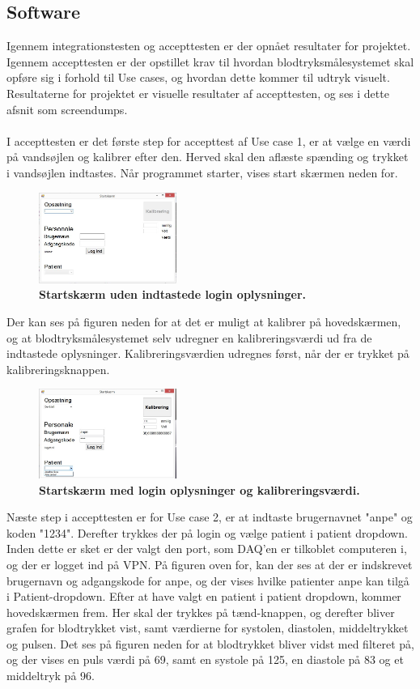 \subsection{Software}
Igennem integrationstesten og accepttesten er der opnået resultater for projektet. Igennem accepttesten er der opstillet krav til hvordan blodtryksmålesystemet skal opføre sig i forhold til Use cases, og hvordan dette kommer til udtryk visuelt. Resultaterne for projektet er visuelle resultater af accepttesten, og ses i dette afsnit som screendumps. \\\\
I accepttesten er det første step for accepttest af Use case 1, er at vælge en værdi på vandsøjlen og kalibrer efter den. Herved skal den aflæste spænding og trykket i vandsøjlen indtastes. Når programmet starter, vises start skærmen neden for.
\begin{figure}[H]
\includegraphics[width =0.4\textwidth , center]{billeder/ITstartGUI}
\caption{\textbf{Startskærm uden indtastede login oplysninger.}}
\end{figure}
Der kan ses på figuren neden for at det er muligt at kalibrer på hovedskærmen, og at blodtryksmålesystemet selv udregner en kalibreringsværdi ud fra de indtastede oplysninger. Kalibreringsværdien udregnes først, når der er trykket på kalibreringsknappen. 
\begin{figure}[H]
\includegraphics[width =0.4\textwidth , center]{billeder/ITstartGUIlogKali}
\caption{\textbf{Startskærm med login oplysninger og kalibreringsværdi.}}
\end{figure}
Næste step i accepttesten er for Use case 2, er at indtaste brugernavnet "anpe" og koden "1234". Derefter trykkes der på login og vælge patient i patient dropdown. Inden dette er sket er der valgt den port, som DAQ’en er tilkoblet computeren i, og der er logget ind på VPN. På figuren oven for, kan der ses at der er indskrevet brugernavn og adgangskode for anpe, og der vises hvilke patienter anpe kan tilgå i Patient-dropdown. Efter at have valgt en patient i patient dropdown, kommer hovedskærmen frem. Her skal der trykkes på tænd-knappen, og derefter bliver grafen for blodtrykket vist, samt værdierne for systolen, diastolen, middeltrykket og pulsen. Det ses på figuren neden for at blodtrykket bliver vidst med filteret på, og der vises en puls værdi på 69, samt en systole på 125, en diastole på 83 og et middeltryk på 96.
